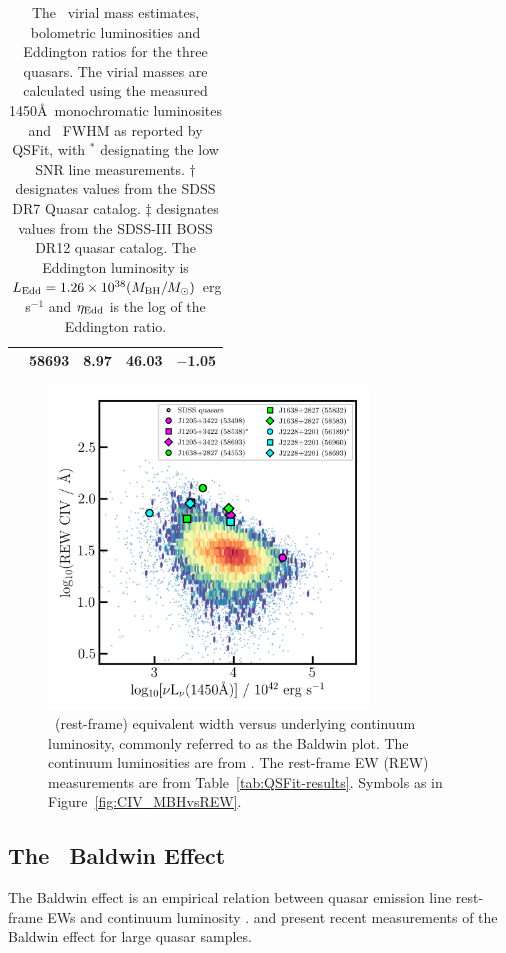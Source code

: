 \documentclass[fleqn,usenatbib]{mnras}
\begin{document}
\begin{table}
\begin{tabular}{l c cc l}
                                              & 58693          &  8.97                      & 46.03                         &  $-$1.05 \\
    \hline
    \hline
  \end{tabular}
  \caption{The \civ\ virial mass estimates, bolometric luminosities and Eddington ratios for the
    three quasars.
    The virial masses are calculated using the measured 1450\AA\ monochromatic luminosites and \civ\ FWHM
    as reported by QSFit, with $^{*}$ designating the low SNR line measurements.
    $\dagger$ designates values from the \citet{Shen2011} SDSS DR7 Quasar catalog.
    $\ddagger$ designates values from the \citet{Kozlowski2017} SDSS-III BOSS DR12 quasar catalog.
    The Eddington luminosity is 
    $L_{\rm Edd} = 1.26\times10^{38} (M_{\rm BH}/M_{\odot})$ erg s$^{-1}$
    and $\eta_{\rm Edd}$ is the log of the Eddington ratio.}
\label{tab:Eddington_ratios} 
\end{table}


\begin{figure}
  \centering
  \includegraphics[width=8.5cm, trim=0.2cm 0.2cm 0.0cm 0.2cm, clip]{figures/CIV_CLQs_Baldwin_20200519.png}
   \vspace{-12pt}
   \caption[]{\civ\ (rest-frame) equivalent width versus underlying
     continuum luminosity, commonly referred to as the Baldwin plot.  The
     continuum luminosities are from \citet{Calderone2017}.  The rest-frame
     EW (REW) measurements are from Table~\ref{tab:QSFit-results}.  Symbols
     as in Figure~\ref{fig:CIV_MBHvsREW}.
   }
  \label{fig:CIV_Baldwin}
\end{figure}

\subsection{The \civ\ Baldwin Effect}
The Baldwin effect \citep{Baldwin1977} is an empirical relation
between quasar emission line rest-frame EWs and continuum luminosity
\citep[e.g.,][]{Shields2007, Hamann2017, Calderone2017}.
\citet{Hamann2017} and \citet{Calderone2017} present recent
measurements of the Baldwin effect for large quasar samples.
\end{document}

